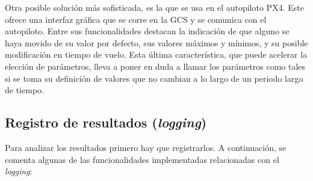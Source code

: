 Otra posible solución más sofisticada, es la que se usa en el autopiloto PX4. Este ofrece una interfaz gráfica que se corre en la GCS y se comunica con el autopiloto. Entre sus funcionalidades destacan la indicación de que alguno se haya movido de su valor por defecto, sus valores máximos y mínimos, y su posible modificación en tiempo de vuelo. Esta última característica, que puede acelerar la elección de parámetros, lleva a poner en duda a llamar los parámetros como tales si se toma su definición de valores que no cambian a lo largo de un periodo largo de tiempo.  

\subsection{Registro de resultados (\textit{logging})}
Para analizar los resultados primero hay que registrarlos.
A continuación, se comenta algunas de las funcionalidades implementadas relacionadas con el \textit{logging}: 
